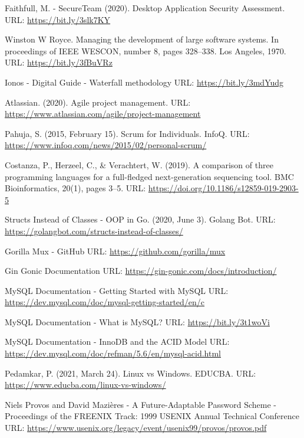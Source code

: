 \begin{thebibliography}{00}
    
 Faithfull, M. - SecureTeam (2020). Desktop Application Security Assessment.
\newline
URL: \url{https://bit.ly/3slk7KY}

 Winston W Royce. Managing the development of large software systems. In proceedings of IEEE WESCON, number 8,
pages 328–338. Los Angeles, 1970.
\newline
URL: \url{https://bit.ly/3fBuVRz}

 Ionos - Digital Guide - Waterfall methodology
\newline
URL: \url{https://bit.ly/3mdYudg}

 Atlassian. (2020). Agile project management.
\newline
URL: \url{https://www.atlassian.com/agile/project-management}

 Pahuja, S. (2015, February 15). Scrum for Individuals. InfoQ.
\newline
URL: \url{https://www.infoq.com/news/2015/02/personal-scrum/}

 Costanza, P., Herzeel, C., \& Verachtert, W. (2019). A comparison of three programming languages for a full-fledged next-generation sequencing tool. BMC Bioinformatics, 20(1), pages 3–5. 
\newline
URL: \url{https://doi.org/10.1186/s12859-019-2903-5}

 Structs Instead of Classes - OOP in Go. (2020, June 3). Golang Bot.
\newline
URL: \url{https://golangbot.com/structs-instead-of-classes/}

 Gorilla Mux - GitHub
\newline
URL: \url{https://github.com/gorilla/mux}

 Gin Gonic Documentation
\newline
URL: \url{https://gin-gonic.com/docs/introduction/}

 MySQL Documentation - Getting Started with MySQL
\newline
URL: \url{https://dev.mysql.com/doc/mysql-getting-started/en/c}

 MySQL Documentation - What is MySQL?
\newline
URL: \url{https://bit.ly/3t1woVi}

 MySQL Documentation - InnoDB and the ACID Model
\newline
URL: \url{https://dev.mysql.com/doc/refman/5.6/en/mysql-acid.html}

 Pedamkar, P. (2021, March 24). Linux vs Windows. EDUCBA.
\newline
URL: \url{https://www.educba.com/linux-vs-windows/}

 Niels Provos and David Mazières - A Future-Adaptable Password Scheme - Proceedings of the FREENIX Track: 1999 USENIX Annual Technical Conference
\newline
URL: \url{https://www.usenix.org/legacy/event/usenix99/provos/provos.pdf}

\end{thebibliography}